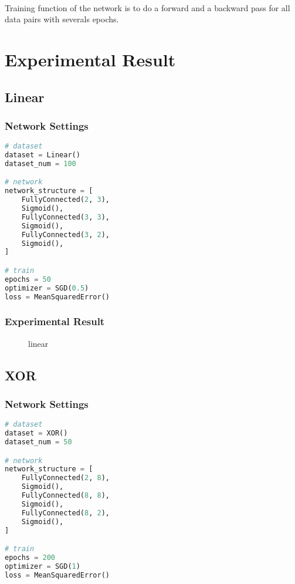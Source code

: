 \paragraph{}
Training function of the network is to do a forward and a backward pass for all data pairs with severals epochs.
\section{Experimental Result}
\subsection{Linear}
\subsubsection{Network Settings}
\begin{lstlisting}[language=Python]
# dataset
dataset = Linear()
dataset_num = 100

# network
network_structure = [
    FullyConnected(2, 3),
    Sigmoid(),
    FullyConnected(3, 3),
    Sigmoid(),
    FullyConnected(3, 2),
    Sigmoid(),
]

# train
epochs = 50
optimizer = SGD(0.5)
loss = MeanSquaredError()
\end{lstlisting}

\subsubsection{Experimental Result}
\begin{figure}[!ht]
    \centering
    \qquad
    \qquad
    \qquad
    \caption{linear}
\end{figure}
\newpage
\subsection{XOR}
\subsubsection{Network Settings}
\begin{lstlisting}[language=Python]
# dataset
dataset = XOR()
dataset_num = 50

# network
network_structure = [
    FullyConnected(2, 8),
    Sigmoid(),
    FullyConnected(8, 8),
    Sigmoid(),
    FullyConnected(8, 2),
    Sigmoid(),
]

# train
epochs = 200
optimizer = SGD(1)
loss = MeanSquaredError()
\end{lstlisting}

